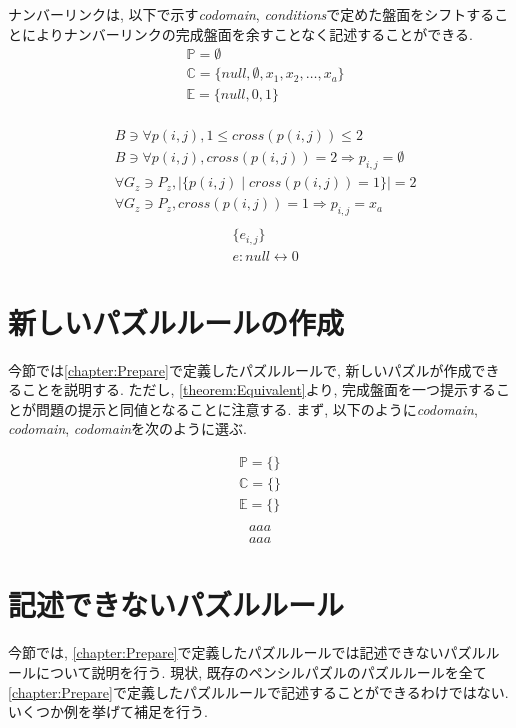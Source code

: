 \begin{example}[ナンバーリンクの数学的記述]
  ナンバーリンクは, 以下で示す\textit{codomain}, \textit{conditions}で定めた盤面をシフトすることによりナンバーリンクの完成盤面を余すことなく記述することができる.
  \begin{align}
     & \mathbb{P}=\emptyset                                         \\
     & \mathbb{C}=\{\textit{null}, \emptyset ,x_1,x_2,\ldots, x_a\} \\
     & \mathbb{E}=\{\textit{null},0,1\}                             \\
  \end{align}

  \begin{align}
     & B\ni \forall p(i,j),1\le \textit{cross}(p(i,j))\le 2                          \\
     & B\ni \forall p(i,j),  \textit{cross}(p(i,j))= 2 \Rightarrow p_{i,j}=\emptyset \\
     & \forall G_z\ni P_z,        |\{p(i,j)\mid cross(p(i,j))=1\}|=2                 \\
     & \forall G_z\ni P_z,     \textit{cross}(p(i,j))= 1 \Rightarrow p_{i,j}=x_a     \\
  \end{align}
  \begin{align}
     & \{e_{i,j}\}                      \\
     & e:\textit{null}\leftrightarrow 0
  \end{align}

\end{example}

\section{新しいパズルルールの作成}\label{section:NewPuzzleRule}
今節では\cref{chapter:Prepare}で定義したパズルルールで, 新しいパズルが作成できることを説明する. ただし, \cref{theorem:Equivalent}より, 完成盤面を一つ提示することが問題の提示と同値となることに注意する. まず, 以下のように\textit{codomain}, \textit{codomain}, \textit{codomain}を次のように選ぶ.

\begin{align}
  \mathbb{P}=\{\} \\
  \mathbb{C}=\{\} \\
  \mathbb{E}=\{\} \\
\end{align}
\begin{align}
  aaa
\end{align}
\begin{align}
  aaa
\end{align}


\section{記述できないパズルルール}\label{section:CannotDescribePuzzleRule}
今節では, \cref{chapter:Prepare}で定義したパズルルールでは記述できないパズルルールについて説明を行う.
現状, 既存のペンシルパズルのパズルルールを全て\cref{chapter:Prepare}で定義したパズルルールで記述することができるわけではない. いくつか例を挙げて補足を行う.
